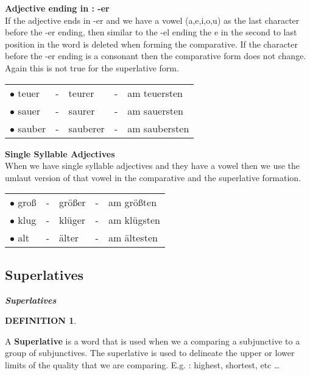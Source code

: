 \documentclass[a4paper,twocolumn,10pt]{article}
\newtheorem{mydef}{DEFINITION}[section]
\newcommand{\subsectionend}
{
\nolinenumbers
\linenumbers
}
\newcommand{\tcolorboxstart}
{
	\nolinenumbers
	\vspace{0.2cm}
	\centering
}
\newcommand{\tcolorboxend}
{
	\justifying
	\vspace{0.2cm}
	\linenumbers
}
\newcommand{\tcolorboxdefinition}[3]
{

\tcolorboxstart
\begin{defn-bg}

	\begin{defn-title}[width=7cm]{}
	{
		\normalsize \textbf{\textit{#1}}
	}
	\end{defn-title}

	\begin{defn-theword}
	{
		\footnotesize
		\begin{mydef} #2
		\end{mydef}
	}
	\end{defn-theword}


	\begin{defn-content}

	\justify
	#3

	\end{defn-content}

\end{defn-bg}
\tcolorboxend
}
\newcommand{\tabularxtable}[3]
{

	\vspace{0.5cm}
	\nolinenumbers

	\begin{tabularx}{#1}{#2}
		#3
	\end{tabularx}

	\linenumbers
	\vspace{0.5cm}
}
\begin{document}
\textbf{Adjective ending in : -er}\\
If the adjective ends in -er and we have
a vowel (a,e,i,o,u) as the last character before the -er ending, then similar to
the -el ending the e in the second to last position in the word is deleted when
forming the comparative. If the character before the -er ending is a consonant
then the comparative form does not change.  Again this is not true for the
superlative form.



\tabularxtable
{0.95\linewidth}
{XlXlX}
{
\rowcolor{white} $\bullet$ teuer  & - & teurer   & - & am teuersten \\
\rowcolor{white} $\bullet$ sauer  & - & saurer   & - & am sauersten \\
\rowcolor{white} $\bullet$ sauber & - & sauberer & - & am saubersten \\
}


\textbf{Single Syllable Adjectives} \\
When we have single syllable adjectives and they have a vowel then we use the
umlaut version of that vowel in the comparative and the superlative formation.



\tabularxtable
{0.95\linewidth}
{XlXlX}
{
\rowcolor{white} $\bullet$ groß & - & größer & - & am größten \\
\rowcolor{white} $\bullet$ klug & - & klüger & - & am klügsten \\
\rowcolor{white} $\bullet$ alt  & - & älter  & - & am ältesten \\


}




\subsectionend

\subsection{Superlatives}
\label{ssec:superlatives}

\tcolorboxdefinition
{Superlatives}
{\label{def:superlatives}}
{
A \textbf {Superlative} is a word that is used when we a comparing a subjunctive
to a group of subjunctives. The superlative is used to delineate the upper or
lower limits of the quality that we are comparing. E.g. : highest, shortest,
etc \ldots 
}
\end{document}
